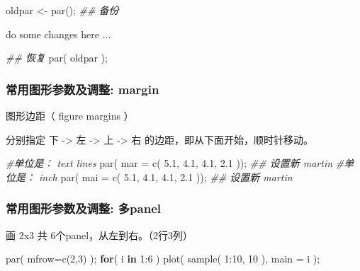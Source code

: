 \documentclass[
]{article}
\newenvironment{Shaded}{}{}
\newcommand{\AttributeTok}[1]{\textcolor[rgb]{0.49,0.56,0.16}{#1}}
\newcommand{\CommentTok}[1]{\textcolor[rgb]{0.38,0.63,0.69}{\textit{#1}}}
\newcommand{\ControlFlowTok}[1]{\textcolor[rgb]{0.00,0.44,0.13}{\textbf{#1}}}
\newcommand{\DecValTok}[1]{\textcolor[rgb]{0.25,0.63,0.44}{#1}}
\newcommand{\DocumentationTok}[1]{\textcolor[rgb]{0.73,0.13,0.13}{\textit{#1}}}
\newcommand{\FloatTok}[1]{\textcolor[rgb]{0.25,0.63,0.44}{#1}}
\newcommand{\FunctionTok}[1]{\textcolor[rgb]{0.02,0.16,0.49}{#1}}
\newcommand{\NormalTok}[1]{#1}
\newcommand{\OtherTok}[1]{\textcolor[rgb]{0.00,0.44,0.13}{#1}}
\newcommand{\SpecialCharTok}[1]{\textcolor[rgb]{0.25,0.44,0.63}{#1}}
\begin{document}
\begin{Shaded}
\begin{Highlighting}[]
\NormalTok{oldpar }\OtherTok{\textless{}{-}} \FunctionTok{par}\NormalTok{(); }\DocumentationTok{\#\# 备份}

\NormalTok{do some changes here ... }

\DocumentationTok{\#\# 恢复}
\FunctionTok{par}\NormalTok{( oldpar ); }
\end{Highlighting}
\end{Shaded}

\hypertarget{ux5e38ux7528ux56feux5f62ux53c2ux6570ux53caux8c03ux6574-margin}{%
\subsubsection{常用图形参数及调整:
margin}\label{ux5e38ux7528ux56feux5f62ux53c2ux6570ux53caux8c03ux6574-margin}}

图形边距（ figure margins ）

分别指定 下 -\textgreater{} 左 -\textgreater{} 上 -\textgreater{} 右
的边距，即从下面开始，顺时针移动。

\begin{Shaded}
\begin{Highlighting}[]
\CommentTok{\#单位是： text lines  }
\FunctionTok{par}\NormalTok{( }\AttributeTok{mar =} \FunctionTok{c}\NormalTok{( }\FloatTok{5.1}\NormalTok{, }\FloatTok{4.1}\NormalTok{, }\FloatTok{4.1}\NormalTok{, }\FloatTok{2.1}\NormalTok{ )); }\DocumentationTok{\#\# 设置新 martin}
\CommentTok{\#单位是： inch }
\FunctionTok{par}\NormalTok{( }\AttributeTok{mai =} \FunctionTok{c}\NormalTok{( }\FloatTok{5.1}\NormalTok{, }\FloatTok{4.1}\NormalTok{, }\FloatTok{4.1}\NormalTok{, }\FloatTok{2.1}\NormalTok{ )); }\DocumentationTok{\#\# 设置新 martin}
\end{Highlighting}
\end{Shaded}

\hypertarget{ux5e38ux7528ux56feux5f62ux53c2ux6570ux53caux8c03ux6574-ux591apanel}{%
\subsubsection{\texorpdfstring{常用图形参数及调整: 多panel
}{常用图形参数及调整: 多panel }}\label{ux5e38ux7528ux56feux5f62ux53c2ux6570ux53caux8c03ux6574-ux591apanel}}

画 2x3 共 6个panel，从左到右。（2行3列）

\begin{Shaded}
\begin{Highlighting}[]
\FunctionTok{par}\NormalTok{( }\AttributeTok{mfrow=}\FunctionTok{c}\NormalTok{(}\DecValTok{2}\NormalTok{,}\DecValTok{3}\NormalTok{) );}
\ControlFlowTok{for}\NormalTok{( i }\ControlFlowTok{in} \DecValTok{1}\SpecialCharTok{:}\DecValTok{6}\NormalTok{ )}
  \FunctionTok{plot}\NormalTok{( }\FunctionTok{sample}\NormalTok{( }\DecValTok{1}\SpecialCharTok{:}\DecValTok{10}\NormalTok{, }\DecValTok{10}\NormalTok{ ), }\AttributeTok{main =}\NormalTok{ i );}
\end{Highlighting}
\end{Shaded}
\end{document}
